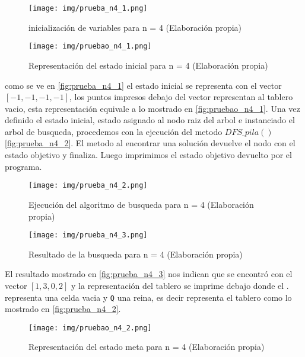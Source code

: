 \documentclass[conference]{IEEEtran}
\begin{document}
\begin{figure}[h]
    \centering
    \texttt{[image: img/prueba\_n4\_1.png]}
    \caption{inicialización de variables para n = 4 (Elaboración propia)}
    \label{fig:prueba_n4_1}
\end{figure} 
\begin{figure}[h]
    \centering
    \texttt{[image: img/pruebao\_n4\_1.png]}
    \caption{Representación del estado inicial para n = 4 (Elaboración propia)}
    \label{fig:pruebao_n4_1}
\end{figure} 

como se ve en \autoref{fig:prueba_n4_1} el estado inicial se representa con el vector $[-1, -1, -1, -1]$, los puntos impresos debajo del vector representan al tablero vacio, esta representación equivale a lo mostrado en \autoref{fig:pruebao_n4_1}. Una vez definido el estado inicial, estado asignado al nodo raiz del arbol e instanciado el arbol de busqueda, procedemos con la ejecución del metodo $DFS\_pila()$ \autoref{fig:prueba_n4_2}. El metodo al encontrar una solución devuelve el nodo con el estado objetivo y finaliza. Luego imprimimos el estado objetivo devuelto por el programa.

\begin{figure}[h]
    \centering
    \texttt{[image: img/prueba\_n4\_2.png]}
    \caption{Ejecución del algoritmo de busqueda para n = 4 (Elaboración propia)}
    \label{fig:prueba_n4_2}
\end{figure}

\begin{figure}[h]
    \centering
    \texttt{[image: img/prueba\_n4\_3.png]}
    \caption{Resultado de la busqueda para n = 4 (Elaboración propia)}
    \label{fig:prueba_n4_3}
\end{figure}

El resultado mostrado en \autoref{fig:prueba_n4_3} nos indican que se encontró con el vector  $[1, 3, 0, 2]$ y la representación del tablero se imprime debajo donde el $.$ representa una celda vacia y \texttt{Q} una reina, es decir representa el tablero como lo mostrado en \autoref{fig:prueba_n4_2}.

\begin{figure}[h]
    \centering
    \texttt{[image: img/pruebao\_n4\_2.png]}
    \caption{Representación del estado meta para n = 4 (Elaboración propia)}
    \label{fig:pruebao_n4_2}
\end{figure}
\end{document}
